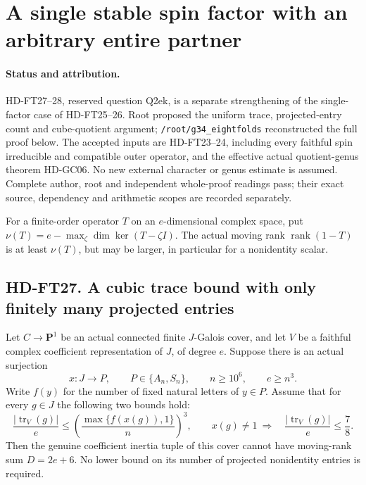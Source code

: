 \section{A single stable spin factor with an arbitrary entire partner}
\label{sec:stable-spin-arbitrary-partner}

\paragraph{Status and attribution.}
HD-FT27--28, reserved question Q2ek, is a separate strengthening of
the single-factor case of HD-FT25--26.  Root proposed the uniform
trace, projected-entry count and cube-quotient argument;
\texttt{/root/g34\_eightfolds} reconstructed the full proof below.
The accepted inputs are HD-FT23--24, including every faithful spin
irreducible and compatible outer operator, and the effective actual
quotient-genus theorem HD-GC06.  No new external character or genus
estimate is assumed. Complete author, root and independent whole-proof
readings pass; their exact source, dependency and arithmetic scopes
are recorded separately.

For a finite-order operator $T$ on an $e$-dimensional complex space,
put $\nu(T)=e-\max_\zeta\dim\ker(T-\zeta I)$.
The actual moving rank $\operatorname{rank}(1-T)$ is at least
$\nu(T)$, but may be larger, in particular for a nonidentity scalar.

\subsection*{HD-FT27. A cubic trace bound with only finitely many projected entries}

\begin{proposition}[HD-FT27]
Let $C\longrightarrow\mathbf P^1$ be an actual connected finite
$J$-Galois cover, and let $V$ be a faithful complex coefficient
representation of $J$, of degree $e$.  Suppose there is an actual
surjection
\[
 x:J\longrightarrow P,\qquad P\in\{A_n,S_n\},\qquad
 n\ge10^6,\qquad e\ge n^3.
 \tag{SSP.1}
\]
Write $f(y)$ for the number of fixed natural letters of $y\in P$.
Assume that for every $g\in J$ the following two bounds hold:
\[
 \frac{|\operatorname{tr}_V(g)|}{e}
 \le\left(\frac{\max\{f(x(g)),1\}}n\right)^3,
 \qquad x(g)\ne1\ \Longrightarrow\quad
 \frac{|\operatorname{tr}_V(g)|}{e}\le\frac78.
 \tag{SSP.2}
\]
Then the genuine coefficient inertia tuple of this cover cannot
have moving-rank sum $D=2e+6$.  No lower bound on its number of
projected nonidentity entries is required.
\end{proposition}

